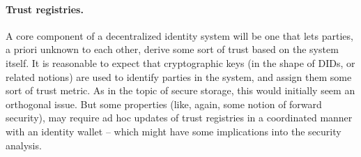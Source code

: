 \paragraph{Trust registries.} %
A core component of a decentralized identity system will be one that lets
parties, a priori unknown to each other, derive some sort of trust based on the
system itself. It is reasonable to expect that cryptographic keys (in the
shape of DIDs, or related notions) are used to identify parties in the system,
and assign them some sort of trust metric. As in the topic of secure storage,
this would initially seem an orthogonal issue. But some properties (like, again,
some notion of forward security), may require ad hoc updates of trust registries
in a coordinated manner with an identity wallet -- which might have some
implications into the security analysis.

